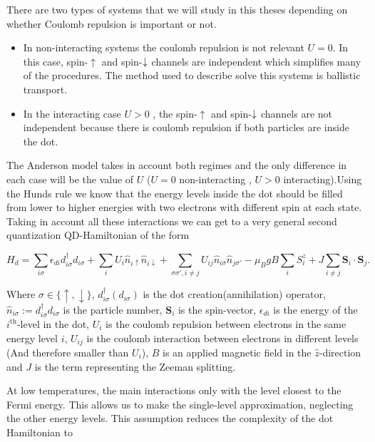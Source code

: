There are two types of systems that we will study in this theses depending on whether Coulomb repulsion is important or not. 
\begin{itemize}
    \item In non-interacting systems the coulomb repulsion is not relevant $U =0$. In this case, spin-$\uparrow$ and spin-$\downarrow$ channels are independent which simplifies many of the procedures. The method used to describe solve this systems is ballistic transport. 
    \item In the interacting case $U>0$ , the spin-$\uparrow$ and spin-$\downarrow$ channels are not independent because there is coulomb repulsion if both particles are inside the dot. 
\end{itemize}


The Anderson model takes in account both regimes and  the only difference in each case will be the value of $U$ ($U=0$ non-interacting , $U>0$ interacting).Using the Hunds rule we know that the energy levels inside the dot should be filled from lower to higher energies with two electrons with different spin at each state. Taking in account all these interactions we can get to a very general second quantization QD-Hamiltonian
of the form \citep[(3.2)]{sindel_numerical_2005}

\[
H_{d}=\sum_{i\sigma}\epsilon_{di}d_{i\sigma}^{\dagger}d_{i\sigma}+\sum_{i}U_{i}\hat{n}_{i\uparrow}\hat{n}_{i\downarrow}+\sum_{\sigma\sigma',i\neq j}U_{ij}\hat{n}_{i\sigma}\hat{n}_{j\sigma'}-\mu_{B}gB\sum_{i}S_{i}^{z}+J\sum_{i\neq j}\mathbf{S}_{i}\cdot\mathbf{S}_{j}.
\]


Where $\sigma\in\{\uparrow,\downarrow\}$, $d_{i\sigma}^{\dagger}\left(d_{i\sigma}\right)$
is the dot creation(annihilation) operator,$\hat{n}_{i\sigma}:=d_{i\sigma}^{\dagger}d_{i\sigma}$
is the particle number, $\mathbf{S}_{i}$ is the spin-vector, $\epsilon_{di}$
is the energy of the $i^{\mbox{th}}$-level in the dot, $U_{i}$ is
the coulomb repulsion between electrons in the same energy level $i$,
$U_{ij}$ is the coulomb interaction between electrons in different
levels (And therefore smaller than $U_{i}$), \textbf{$B$} is an
applied magnetic field in the $\hat{z}$-direction and $J$ is the
term representing the Zeeman splitting. 

At low temperatures, the main interactions only with the level closest to the Fermi energy. This allows us to make the single-level approximation, neglecting the other energy levels. This assumption reduces the complexity of the dot Hamiltonian to \\


